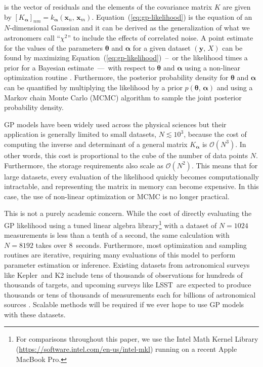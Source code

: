 \documentclass[manuscript, letterpaper]{aastex6}
\newcommand{\project}[1]{\textsf{#1}}
\newcommand{\kepler}{\project{Kepler}}
\newcommand{\lsst}{\project{LSST}}
\renewcommand{\eqref}[1]{\ref{eq:#1}}
\newcommand{\Eq}[1]{Equation~(\eqref{#1})}
\newcommand{\eq}[1]{\Eq{#1}}
\newcommand{\bvec}[1]{{\ensuremath{\boldsymbol{#1}}}}
\newcommand{\response}[1]{{#1}}
\newcommand{\responseb}[1]{{#1}}
\begin{document}
is the vector of residuals and the elements of the covariance matrix $K$ are
given by $[K_\bvec{\alpha}]_{nm} = k_\bvec{\alpha}(\bvec{x}_n,\,\bvec{x}_m)$.
\eq{gp-likelihood} is the equation of an $N$-dimensional Gaussian and it can
be derived as the generalization of what we astronomers call ``$\chi^2$''
to include the effects of correlated noise.
\response{
    A point estimate for the values of the parameters $\bvec{\theta}$ and
    $\bvec{\alpha}$ for a given dataset $(\bvec{y},\,X)$ can be found by
    maximizing \eq{gp-likelihood}~--~\responseb{or the likelihood times a prior for
        a Bayesian estimate}~---~with respect to $\bvec{\theta}$ and $\bvec{\alpha}$
    using a non-linear optimization routine \citep{Nocedal:2006}.}
\responseb{Furthermore, the posterior probability density for $\bvec{\theta}$
    and $\bvec{\alpha}$ can be quantified by multiplying the likelihood by a prior
    $p(\bvec{\theta},\,\bvec{\alpha})$ and using a Markov chain Monte Carlo (MCMC)
    algorithm to sample the joint posterior probability density.}

GP models have been widely used across the physical sciences but their
application is generally limited to small datasets, \response{$N \lesssim
        10^3$}, because the cost of computing the inverse and determinant of a general
matrix $K_\bvec{\alpha}$ is $\mathcal{O}(N^3)$.
In other words, this cost is proportional to the cube of the number of data
points $N$.
Furthermore, the storage requirements also scale as $\mathcal{O}(N^2)$.
This means that for large datasets, every evaluation of the likelihood quickly
becomes computationally intractable, and representing the matrix in memory can
become expensive.
In this case, the use of non-linear optimization or MCMC is no longer
practical.

\response{This is not a purely academic concern.
    While the cost of directly evaluating the GP likelihood using a tuned linear
    algebra library\footnote{For comparisons throughout this paper, we use the
        Intel Math Kernel Library (\url{https://software.intel.com/en-us/intel-mkl})
        running on a recent Apple MacBook Pro.} with a dataset of $N=1024$
    measurements is less than a tenth of a second, the same calculation with
    $N=8192$ takes over 8~seconds.
    Furthermore, most optimization and sampling routines are iterative, requiring
    many evaluations of this model to perform parameter estimation or inference.
    Existing datasets from astronomical surveys like \kepler\ and \project{K2}
    include tens of thousands of observations for hundreds of thousands of
    targets, and upcoming surveys like \lsst\ are expected to produce thousands or
    tens of thousands of measurements each for billions of astronomical sources
    \citep{Ivezic:2008}.
    Scalable methods will be required if we ever hope to use GP models with these
    datasets.
}
\end{document}
